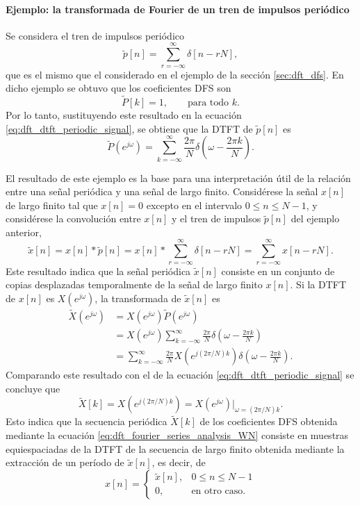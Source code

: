 \documentclass[a4paper]{report}
\begin{document}
\paragraph{Ejemplo: la transformada de Fourier de un tren de impulsos periódico} Se considera el tren de impulsos periódico
\[
 \tilde{p}[n]=\sum_{r=-\infty}^\infty\delta[n-rN],
\]
que es el mismo que el considerado en el ejemplo de la sección \ref{sec:dft_dfs}. En dicho ejemplo se obtuvo que los coeficientes DFS son
\[
 \tilde{P}[k]=1,
 \qquad\textrm{para todo }k.
\]
Por lo tanto, sustituyendo este resultado en la ecuación \ref{eq:dft_dtft_periodic_signal}, se obtiene que la DTFT de \(\tilde{p}[n]\) es
\[
 \tilde{P}(e^{j\omega})=\sum_{k=-\infty}^\infty\frac{2\pi}{N}\delta\left(\omega-\frac{2\pi k}{N}\right).
\]

El resultado de este ejemplo es la base para una interpretación útil de la relación entre una señal periódica y una señal de largo finito. Considérese la señal \(x[n]\) de largo finito tal que \(x[n]=0\) excepto en el intervalo \(0\leq n\leq N-1\), y considérese la convolución entre \(x[n]\) y el tren de impulsos \(\tilde{p}[n]\) del ejemplo anterior,
\[
 \tilde{x}[n]=x[n]*\tilde{p}[n]=x[n]*\sum_{r=-\infty}^\infty\delta[n-rN]=\sum_{r=-\infty}^\infty x[n-rN].
\]
Este resultado indica que la señal periódica \(\tilde{x}[n]\) consiste en un conjunto de copias desplazadas temporalmente de la señal de largo finito \(x[n]\). Si la DTFT de \(x[n]\) es \(X(e^{j\omega})\), la transformada de \(\tilde{x}[n]\) es
\begin{align*}
 \tilde{X}(e^{j\omega})&=X(e^{j\omega})\tilde{P}(e^{j\omega})\\
  &=X(e^{j\omega})\sum_{k=-\infty}^\infty\frac{2\pi}{N}\delta\left(\omega-\frac{2\pi k}{N}\right)\\
  &=\sum_{k=-\infty}^\infty\frac{2\pi}{N}X(e^{j(2\pi/N)k})\delta\left(\omega-\frac{2\pi k}{N}\right).
\end{align*}
Comparando este resultado con el de la ecuación \ref{eq:dft_dtft_periodic_signal} se concluye que 
\[
 \tilde{X}[k]=X(e^{j(2\pi/N)k})=X(e^{j\omega})\Big|_{\omega=(2\pi/N)k}.
\]
Esto indica que la secuencia periódica \(\tilde{X}[k]\) de los coeficientes DFS obtenida mediante la ecuación \ref{eq:dft_fourier_series_analysis_WN} consiste en muestras equiespaciadas de la DTFT de la secuencia de largo finito obtenida mediante la extracción de un período de \(\tilde{x}[n]\), es decir, de
\begin{equation}\label{eq:dft_dtft_periodic_period_extraction}
 x[n]=
 \left\{
 \begin{array}{ll}
  \tilde{x}[n], & 0\leq n\leq N-1\\
  0, & \textrm{en otro caso.}
 \end{array}
 \right. 
\end{equation}
\end{document}

